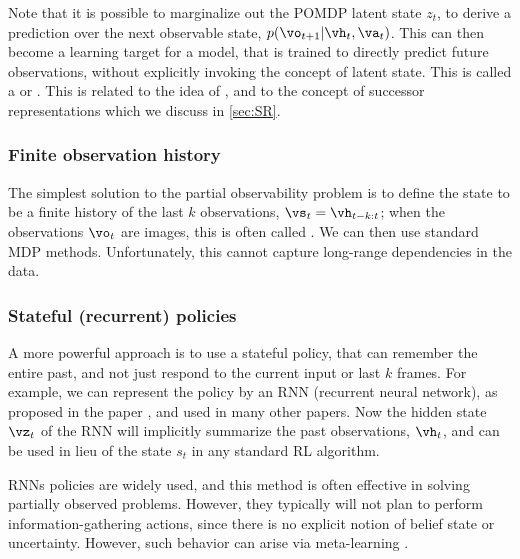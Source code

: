 Note that it is possible to 
marginalize out the POMDP
latent state $z_t$,
to derive a prediction over the next observable state,
$p(\vo_{t+1}|\vh_t,\va_t)$.
This can then become a learning  target for a model, that is trained
to directly
predict  future observations, without explicitly invoking the concept
of latent state.
This is called a 
or  \citep{PSR}.
This is related to the idea of
\citep{Jaeger2000},
and to the concept of
successor representations
which we discuss in  \cref{sec:SR}.


\subsubsection{Finite observation history}

The simplest solution to the partial
observability problem is to  define
the state to be a finite history of the last $k$ observations,
$\vs_t = \vh_{t-k:t}$;
when the observations $\vo_t$ are images,
this is often called .
We can then use standard MDP methods.
Unfortunately, this cannot capture long-range dependencies in the data.

\subsubsection{Stateful (recurrent) policies}
  
A more powerful approach is to use a stateful policy,
that can remember the entire past, and not just respond
to the current input or last $k$ frames.
For example, we can represent the policy by an RNN (recurrent neural
network),
 as proposed in  the  paper \citep{R2D2},
 and used in many other papers.
Now the hidden state $\vz_t$ of the RNN
will implicitly summarize the past observations, $\vh_t$,
and can be used in lieu of the state $s_t$ in any standard RL algorithm.


RNNs policies are widely used, and this method is often effective in solving partially
observed problems. However, they typically will not plan to perform
information-gathering actions, since there is no explicit notion of
belief state or uncertainty. However, such behavior can arise
via meta-learning \citep{Mikulik2020}.




